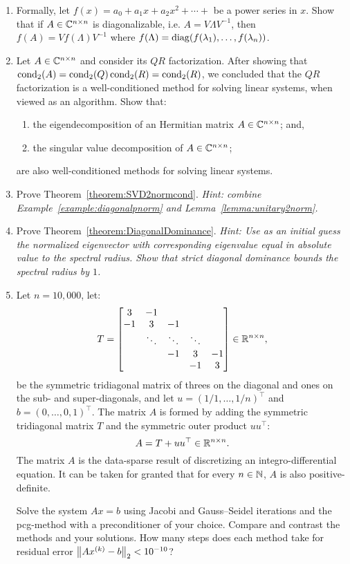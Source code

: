 \begin{enumerate}
\begin{enumerate}
\end{enumerate}

\item Formally, let $f(x) = a_0 + a_1x + a_2x^2 + \cdots +$ be a power series in $x$. Show that if $A\in\mathbb{C}^{n\times n}$ is diagonalizable, i.e. $A=V\Lambda V^{-1}$, then $f(A) = Vf(\Lambda)V^{-1}$ where $f(\Lambda) = \operatorname{diag}(f(\lambda_1),\ldots,f(\lambda_n))$.

\item Let $A\in\mathbb{C}^{n\times n}$ and consider its $QR$ factorization. After showing that $\operatorname{cond}_2(A) = \operatorname{cond}_2(Q)\operatorname{cond}_2(R) = \operatorname{cond}_2(R)$, we concluded that the $QR$ factorization is a well-conditioned method for solving linear systems, when viewed as an algorithm. Show that:
\begin{enumerate}
\item the eigendecomposition of an Hermitian matrix $A\in\mathbb{C}^{n\times n}$; and,
\item the singular value decomposition of $A\in\mathbb{C}^{n\times n}$;
\end{enumerate}
are also well-conditioned methods for solving linear systems.

\item Prove Theorem~\ref{theorem:SVD2normcond}. {\em Hint: combine Example~\ref{example:diagonalpnorm} and Lemma~\ref{lemma:unitary2norm}.}

\item Prove Theorem~\ref{theorem:DiagonalDominance}. {\em Hint: Use as an initial guess the normalized eigenvector with corresponding eigenvalue equal in absolute value to the spectral radius. Show that strict diagonal dominance bounds the spectral radius by $1$.}

\item Let $n=10,000$, let:
\[
T = \begin{bmatrix}
3 & -1\\
-1 & 3 & -1\\
& \ddots & \ddots & \ddots\\
& & -1 & 3 & -1\\
&&&-1 & 3
\end{bmatrix} \in\mathbb{R}^{n\times n},
\]
be the symmetric tridiagonal matrix of threes on the diagonal and ones on the sub- and super-diagonals, and let $u = (1/1,\ldots,1/n)^\top$ and $b=(0,\ldots,0,1)^\top$. The matrix $A$ is formed by adding the symmetric tridiagonal matrix $T$ and the symmetric outer product $uu^\top$:
\[
A = T+uu^\top \in\mathbb{R}^{n\times n}.
\]
The matrix $A$ is the data-sparse result of discretizing an integro-differential equation. It can be taken for granted that for every $n\in\mathbb{N}$, $A$ is also positive-definite.

Solve the system $Ax=b$ using Jacobi and Gauss--Seidel iterations and the pcg-method with a preconditioner of your choice. Compare and contrast the methods and your solutions. How many steps does each method take for residual error $\left\|{Ax^{(k)}-b}\right\|_2 < 10^{-10}$?

\end{enumerate}